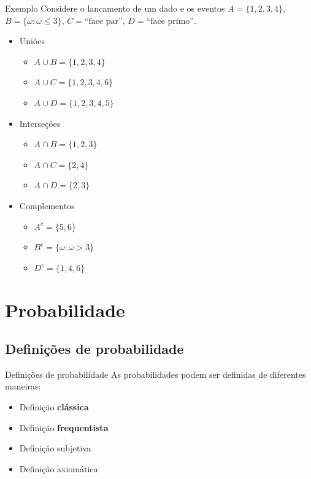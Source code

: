\documentclass[10pt]{beamer}\usepackage[]{graphicx}\usepackage[]{color}
\theoremstyle{definition}
\begin{document}
\begin{frame}[fragile]{Exemplo}
  Considere o lancamento de um dado e os eventos $A = \{1,2,3,4\}$, $B =
  \{\omega:\omega\leq 3\}$, $C = \text{``face par''}$, $D = \text{``face
    primo''}$.
  \begin{itemize}
  \item Uniões
    \begin{itemize}
    \item $A\cup B = \{1,2,3,4\}$
    \item $A\cup C = \{1,2,3,4,6\}$
    \item $A\cup D = \{1,2,3,4,5\}$
    \end{itemize}
  \end{itemize}
  \begin{itemize}
  \item Interseções
    \begin{itemize}
    \item $A\cap B = \{1,2,3\}$
    \item $A\cap C = \{2,4\}$
    \item $A\cap D = \{2,3\}$
    \end{itemize}
  \end{itemize}
  \begin{itemize}
  \item Complementos
    \begin{itemize}
    \item $A^c = \{5,6\}$
    \item $B^c = \{\omega: \omega> 3\}$
    \item $D^c = \{1,4,6\}$
    \end{itemize}
  \end{itemize}
\end{frame}

\section{Probabilidade}

\subsection{Definições de probabilidade}

\begin{frame}{Definições de probabilidade}
  As probabilidades podem ser definidas de diferentes maneiras:
  \begin{itemize}
  \item Definição \textbf{clássica}
  \item Definição \textbf{frequentista}
  \item Definição subjetiva
  \item Definição axiomática
  \end{itemize}
\end{frame}
\end{document}

